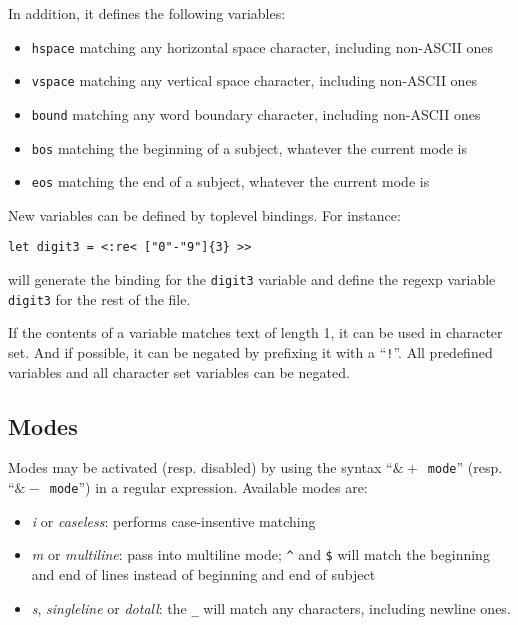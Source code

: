 \documentclass{article}
\begin{document}
In addition, it defines the following variables:

\begin{itemize}
\item \texttt{hspace} matching any horizontal space character, including non-ASCII ones
\item \texttt{vspace} matching any vertical space character, including non-ASCII ones
\item \texttt{bound} matching any word boundary character, including non-ASCII ones
\item \texttt{bos} matching the beginning of a subject, whatever the current mode is
\item \texttt{eos} matching the end of a subject, whatever the current mode is
\end{itemize}

New variables can be defined by toplevel bindings. For instance:

\lstset{language=[Objective]Caml}\begin{lstlisting}
let digit3 = <:re< ["0"-"9"]{3} >>
\end{lstlisting}

will generate the binding for the \texttt{digit3} variable and define
the regexp variable \texttt{digit3} for the rest of the file.

If the contents of a variable matches text of length 1, it can be used
in character set. And if possible, it can be negated by prefixing it
with a ``\texttt{!}''. All predefined variables and all character set
variables can be negated.

\subsection{Modes}

Modes may be activated (resp. disabled) by using the syntax
``\texttt{$\&+$ mode}'' (resp. ``\texttt{$\&-$ mode}'') in a regular
expression. Available modes are:

\begin{itemize}
\item \emph{i} or \emph{caseless}: performs case-insentive matching
\item \emph{m} or \emph{multiline}: pass into multiline mode;
  \texttt{\^} and \texttt{\$} will match the beginning and end of
  lines instead of beginning and end of subject
\item \emph{s}, \emph{singleline} or \emph{dotall}: the \texttt{\_}
  will match any characters, including newline ones.
\end{itemize}
\end{document}
